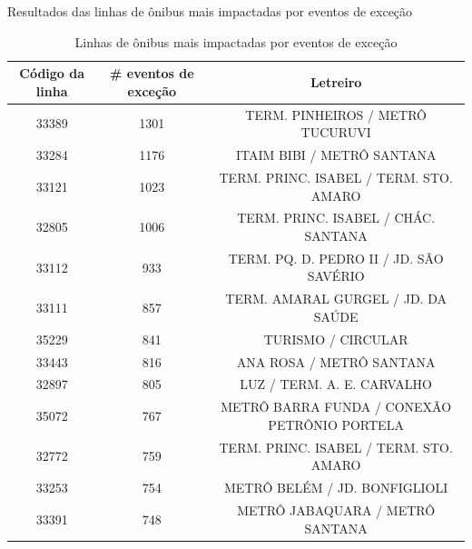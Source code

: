 \documentclass{beamer}
\begin{document}
\begin{frame}{Resultados das linhas de ônibus mais impactadas por eventos de exceção}
\begin {table} [!htb]
\centering
\begin{adjustbox}{max height=10mm, width=4in}
\begin{threeparttable}
\caption {Linhas de ônibus mais impactadas por eventos de exceção}
\label {tab:impacted_bus_code_lines}
\begin {tabular} {c|c|c}
 \toprule
\textbf{Código da linha} & \textbf{\# eventos de exceção} & \textbf{Letreiro} \\
    \midrule
    33389 & 1301  & TERM. PINHEIROS / METRÔ TUCURUVI  \\
\hline

    33284 & 1176  & ITAIM BIBI / METRÔ SANTANA  \\
\hline

    33121 & 1023  & TERM. PRINC. ISABEL / TERM. STO. AMARO  \\
\hline

    32805 & 1006  & TERM. PRINC. ISABEL / CHÁC. SANTANA  \\
\hline

    33112 & 933   & TERM. PQ. D. PEDRO II / JD. SÃO SAVÉRIO  \\
\hline

    33111 & 857   & TERM. AMARAL GURGEL / JD. DA SAÚDE  \\
\hline

    35229 & 841   & TURISMO / CIRCULAR  \\
\hline

    33443 & 816   & ANA ROSA / METRÔ SANTANA  \\
\hline

    32897 & 805   & LUZ / TERM. A. E. CARVALHO  \\
\hline

    35072 & 767   & METRÔ BARRA FUNDA / CONEXÃO PETRÔNIO PORTELA  \\
\hline

    32772 & 759   & TERM. PRINC. ISABEL / TERM. STO. AMARO  \\
\hline

    33253 & 754   & METRÔ BELÉM / JD. BONFIGLIOLI  \\
\hline

    33391 & 748   & METRÔ JABAQUARA / METRÔ SANTANA  \\
\hline


\end{tabular}
\end{threeparttable}
\end{adjustbox}
\end{table}
\end{frame}
\end{document}
